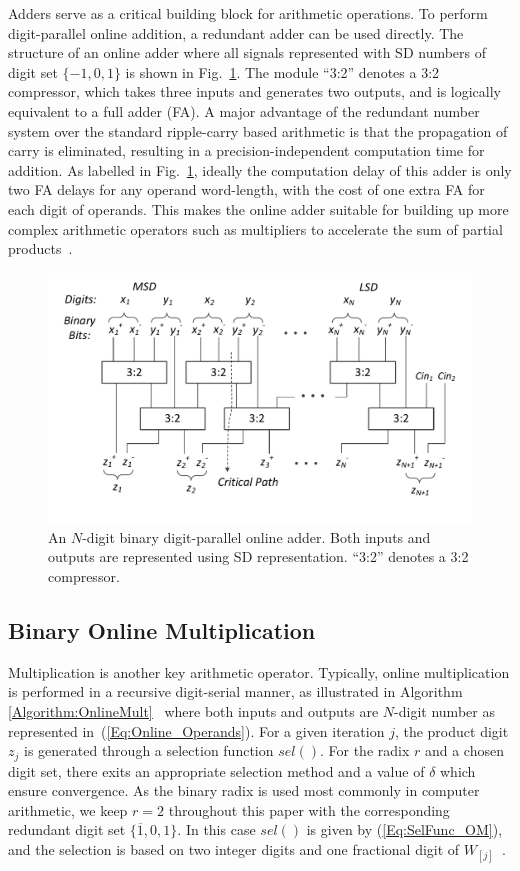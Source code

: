 \documentclass[journal]{IEEEtran}
\begin{document}
Adders serve as a critical building block for arithmetic operations. To perform digit-parallel online addition, a redundant adder can be used directly. The structure of an online adder where all signals represented with SD numbers of digit set $\{-1,0,1\}$ is shown in Fig.~\ref{Fig:Radix2SD_adder}. The module ``3:2'' denotes a 3:2 compressor, which takes three inputs and generates two outputs, and is logically equivalent to a full adder (FA). A major advantage of the redundant number system over the standard ripple-carry based arithmetic is that the propagation of carry is eliminated, resulting in a precision-independent computation time for addition. As labelled in Fig.~\ref{Fig:Radix2SD_adder}, ideally the computation delay of this adder is only two FA delays for any operand word-length, with the cost of one extra FA for each digit of operands. This makes the online adder suitable for building up more complex arithmetic operators such as multipliers to accelerate the sum of partial products~\cite{RedundantMult_1987}.

\begin{figure}[tbp]
  \centering
  \includegraphics[width=.5\textwidth]{./Figures/SDAdder2.pdf}
  \vspace{-6ex}
  \caption{An $N$-digit binary digit-parallel online adder. Both inputs and outputs are represented using SD representation. ``3:2'' denotes a 3:2 compressor.}
  \label{Fig:Radix2SD_adder}
\end{figure}

\subsection{Binary Online Multiplication}\label{subsec:OnlineMultiplier}

Multiplication is another key arithmetic operator. Typically, online multiplication is performed in a recursive digit-serial manner, as illustrated in Algorithm \ref{Algorithm:OnlineMult}~\cite{Ercegovac_OnlineMult} where both inputs and outputs are $N$-digit number as represented in~(\ref{Eq:Online_Operands}). For a given iteration $j$, the product digit $z_j$ is generated through a selection function $sel()$. For the radix $r$ and a chosen digit set, there exits an appropriate selection method and a value of $\delta$ which ensure convergence. As the binary radix is used most commonly in computer arithmetic, we keep $r=2$ throughout this paper with the corresponding redundant digit set $\{\overline{1},0,1\}$. In this case $sel()$ is given by (\ref{Eq:SelFunc_OM}), and the selection is based on two integer digits and one fractional digit of $W_{[j]}$~\cite{Ercegovac_OnlineMult}.
\end{document}
